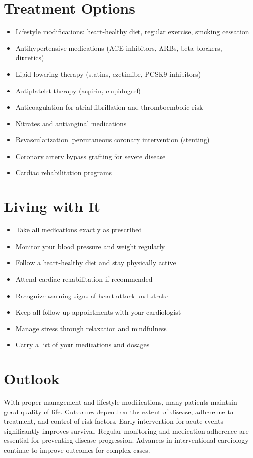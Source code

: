\section{Treatment Options}

\begin{itemize}[noitemsep]
  \item Lifestyle modifications: heart-healthy diet, regular exercise, smoking cessation
  \item Antihypertensive medications (ACE inhibitors, ARBs, beta-blockers, diuretics)
  \item Lipid-lowering therapy (statins, ezetimibe, PCSK9 inhibitors)
  \item Antiplatelet therapy (aspirin, clopidogrel)
  \item Anticoagulation for atrial fibrillation and thromboembolic risk
  \item Nitrates and antianginal medications
  \item Revascularization: percutaneous coronary intervention (stenting)
  \item Coronary artery bypass grafting for severe disease
  \item Cardiac rehabilitation programs
\end{itemize}

\section{Living with It}

\begin{itemize}[noitemsep]
  \item Take all medications exactly as prescribed
  \item Monitor your blood pressure and weight regularly
  \item Follow a heart-healthy diet and stay physically active
  \item Attend cardiac rehabilitation if recommended
  \item Recognize warning signs of heart attack and stroke
  \item Keep all follow-up appointments with your cardiologist
  \item Manage stress through relaxation and mindfulness
  \item Carry a list of your medications and dosages
\end{itemize}

\section{Outlook}
With proper management and lifestyle modifications, many patients maintain good quality of life. Outcomes depend on the extent of disease, adherence to treatment, and control of risk factors. Early intervention for acute events significantly improves survival. Regular monitoring and medication adherence are essential for preventing disease progression. Advances in interventional cardiology continue to improve outcomes for complex cases.
